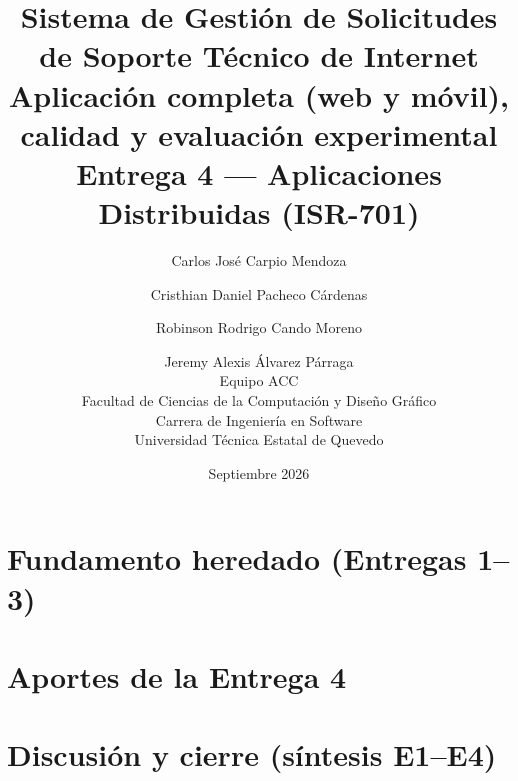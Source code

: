 \documentclass[11pt,letterpaper]{article}
\title{\textbf{Sistema de Gestión de Solicitudes de Soporte Técnico de Internet}\\
\large Aplicación completa (web y móvil), calidad y evaluación experimental\\
\large Entrega 4 --- Aplicaciones Distribuidas (ISR-701)}
\author{
Carlos Jos\'e Carpio Mendoza \and
Cristhian Daniel Pacheco C\'ardenas \and
Robinson Rodrigo Cando Moreno \and
Jeremy Alexis \'Alvarez P\'arraga\\[1em]
\normalsize Equipo ACC\\
\normalsize Facultad de Ciencias de la Computaci\'on y Dise\~no Gr\'afico\\
\normalsize Carrera de Ingenier\'ia en Software\\
\normalsize Universidad T\'ecnica Estatal de Quevedo
}
\date{Septiembre 2026}
\begin{document}
\maketitle



\tableofcontents
\newpage

\part{Fundamento heredado (Entregas 1--3)}
\label{part:heredado-e1-e3}








\part{Aportes de la Entrega 4}
\label{part:aportes-e4}









\part{Discusión y cierre (síntesis E1--E4)}
\label{part:discusion-cierre}







\end{document}

